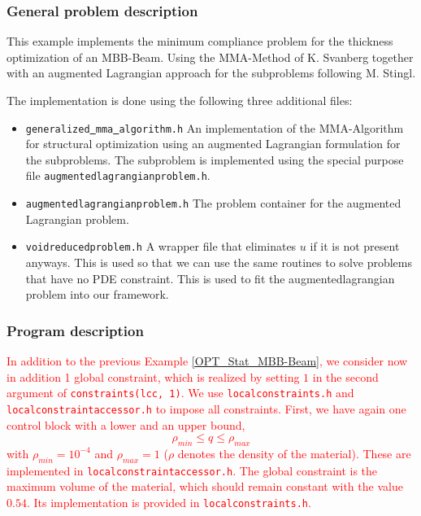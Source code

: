 \subsubsection{General problem description}
This example implements the minimum compliance problem for the thickness optimization 
of an MBB-Beam. Using the MMA-Method of K. Svanberg together with an augmented Lagrangian 
approach for the subproblems following M. Stingl.

The implementation is done using the following three additional files:

\begin{itemize}
\item \texttt{generalized\underline{ }mma\underline{ }algorithm.h}
  An implementation of the MMA-Algorithm for structural optimization using an augmented
  Lagrangian formulation for the subproblems. The subproblem is implemented using the 
  special purpose\\ file \texttt{augmentedlagrangianproblem.h}.
\item \texttt{augmentedlagrangianproblem.h} The problem container 
  for the augmented Lagrangian problem.
\item \texttt{voidreducedproblem.h} A wrapper file that eliminates $u$ 
  if it is not present anyways. This is used so that we can use the same routines to 
  solve problems that have no PDE constraint. This is used to fit the augmentedlagrangian 
  problem into our framework.
\end{itemize}


\subsubsection{Program description}
\textcolor{red}{
In addition to the previous Example \ref{OPT_Stat_MBB-Beam}, we consider now 
in addition 1 global constraint, which is realized by setting $1$ in the 
second argument of \texttt{constraints(lcc, 1)}. 
We use 
\texttt{localconstraints.h} and \texttt{localconstraintaccessor.h} to impose 
all constraints. First, we have again one control block with a lower and 
an upper bound, 
\[
\rho_{min} \leq q \leq \rho_{max}
\]
with $\rho_{min} = 10^{-4}$ and $\rho_{max} = 1$ ($\rho$ denotes the density
of the material). These are implemented in \texttt{localconstraintaccessor.h}.
The global constraint is the maximum volume of the material,
which should remain constant with the value $0.54$. Its implementation is 
provided in \texttt{localconstraints.h}.
}
